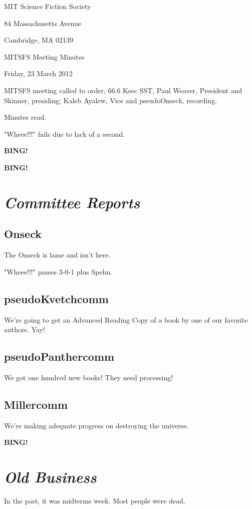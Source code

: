 \documentclass[10pt]{article}
\newcommand{\bing}{{\bf BING!} }
\newcommand{\goto}[1]{\bing \vskip 12pt \section*{{\em{#1}}}}
\newcommand{\ps}{ plus Spehn\xspace}
\newcommand{\skinner}{Paul Weaver, President and Skinner}
\newcommand{\onseck}{Kaleb Ayalew, Vice and pseudoOnseck}
\newcommand{\meetingdate}{Friday, 23 March 2012}
\begin{document}
\begin{center}

MIT Science Fiction Society

84 Massachusetts Avenue

Cambridge, MA 02139

\vspace{12pt}

MITSFS Meeting Minutes

\meetingdate

\end{center}

\vspace{18pt}

\setlength{\parskip}{6pt}

\noindent
MITSFS meeting called to order, 66.6 Ksec SST,
\skinner, presiding; \onseck, recording.

Minutes read.

"Wheee!!!" fails due to lack of a second.

\bing

\goto{Committee Reports}

\subsection*{Onseck}

The Onseck is lame and isn't here.

"Wheee!!!" passes 3-0-1\ps.

\subsection*{pseudoKvetchcomm}

We're going to get an Advanced Reading Copy of a book by one of our
favorite authors.  Yay!

\subsection*{pseudoPanthercomm}

We got one hundred new books!  They need processing!

\subsection*{Millercomm}

We're making adequate progress on destroying the universe.


\goto{Old Business}

In the past, it was midterms week.  Most people were dead.
\end{document}
